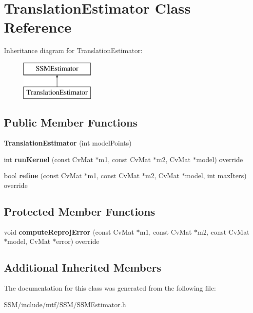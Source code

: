 \hypertarget{classTranslationEstimator}{\section{Translation\-Estimator Class Reference}
\label{classTranslationEstimator}
}
Inheritance diagram for Translation\-Estimator\-:\begin{figure}[H]
\begin{center}
\leavevmode
\includegraphics[height=2.000000cm]{classTranslationEstimator}
\end{center}
\end{figure}
\subsection*{Public Member Functions}
\begin{DoxyCompactItemize}
\item 
\hypertarget{classTranslationEstimator_aa09e9abfea7896f7b063ea810731b1f8}{{\bfseries Translation\-Estimator} (int model\-Points)}\label{classTranslationEstimator_aa09e9abfea7896f7b063ea810731b1f8}

\item 
\hypertarget{classTranslationEstimator_aa37c66b0e02493f8f8cdca5284374fe0}{int {\bfseries run\-Kernel} (const Cv\-Mat $\ast$m1, const Cv\-Mat $\ast$m2, Cv\-Mat $\ast$model) override}\label{classTranslationEstimator_aa37c66b0e02493f8f8cdca5284374fe0}

\item 
\hypertarget{classTranslationEstimator_a4b7bf0545bcf19685413a0579979c8d8}{bool {\bfseries refine} (const Cv\-Mat $\ast$m1, const Cv\-Mat $\ast$m2, Cv\-Mat $\ast$model, int max\-Iters) override}\label{classTranslationEstimator_a4b7bf0545bcf19685413a0579979c8d8}

\end{DoxyCompactItemize}
\subsection*{Protected Member Functions}
\begin{DoxyCompactItemize}
\item 
\hypertarget{classTranslationEstimator_aa40224c32c54451cf1f37997ec9ebc3a}{void {\bfseries compute\-Reproj\-Error} (const Cv\-Mat $\ast$m1, const Cv\-Mat $\ast$m2, const Cv\-Mat $\ast$model, Cv\-Mat $\ast$error) override}\label{classTranslationEstimator_aa40224c32c54451cf1f37997ec9ebc3a}

\end{DoxyCompactItemize}
\subsection*{Additional Inherited Members}


The documentation for this class was generated from the following file\-:\begin{DoxyCompactItemize}
\item 
S\-S\-M/include/mtf/\-S\-S\-M/S\-S\-M\-Estimator.\-h\end{DoxyCompactItemize}
